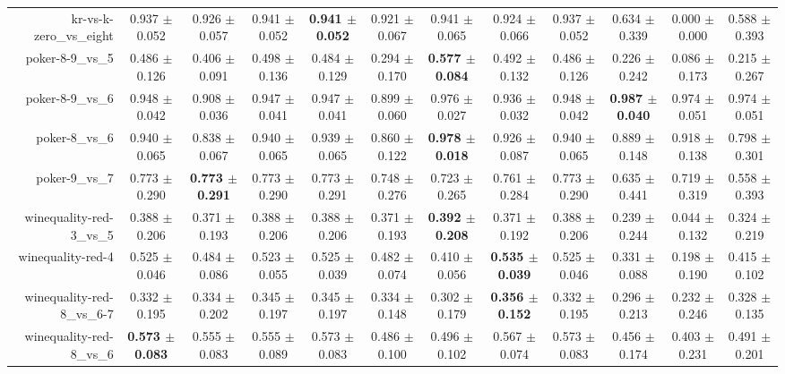 \begin{table}[!ht]
{\begin{tabular}{r c c c c c c c c c c c}
kr-vs-k-zero\_vs\_eight & 0.937 $\pm$ 0.052 & 0.926 $\pm$ 0.057 & 0.941 $\pm$ 0.052 & \textbf{0.941 $\pm$ 0.052} & 0.921 $\pm$ 0.067 & 0.941 $\pm$ 0.065 & 0.924 $\pm$ 0.066 & 0.937 $\pm$ 0.052 & 0.634 $\pm$ 0.339 & 0.000 $\pm$ 0.000 & 0.588 $\pm$ 0.393 \\
poker-8-9\_vs\_5 & 0.486 $\pm$ 0.126 & 0.406 $\pm$ 0.091 & 0.498 $\pm$ 0.136 & 0.484 $\pm$ 0.129 & 0.294 $\pm$ 0.170 & \textbf{0.577 $\pm$ 0.084} & 0.492 $\pm$ 0.132 & 0.486 $\pm$ 0.126 & 0.226 $\pm$ 0.242 & 0.086 $\pm$ 0.173 & 0.215 $\pm$ 0.267 \\
poker-8-9\_vs\_6 & 0.948 $\pm$ 0.042 & 0.908 $\pm$ 0.036 & 0.947 $\pm$ 0.041 & 0.947 $\pm$ 0.041 & 0.899 $\pm$ 0.060 & 0.976 $\pm$ 0.027 & 0.936 $\pm$ 0.032 & 0.948 $\pm$ 0.042 & \textbf{0.987 $\pm$ 0.040} & 0.974 $\pm$ 0.051 & 0.974 $\pm$ 0.051 \\
poker-8\_vs\_6 & 0.940 $\pm$ 0.065 & 0.838 $\pm$ 0.067 & 0.940 $\pm$ 0.065 & 0.939 $\pm$ 0.065 & 0.860 $\pm$ 0.122 & \textbf{0.978 $\pm$ 0.018} & 0.926 $\pm$ 0.087 & 0.940 $\pm$ 0.065 & 0.889 $\pm$ 0.148 & 0.918 $\pm$ 0.138 & 0.798 $\pm$ 0.301 \\
poker-9\_vs\_7 & 0.773 $\pm$ 0.290 & \textbf{0.773 $\pm$ 0.291} & 0.773 $\pm$ 0.290 & 0.773 $\pm$ 0.291 & 0.748 $\pm$ 0.276 & 0.723 $\pm$ 0.265 & 0.761 $\pm$ 0.284 & 0.773 $\pm$ 0.290 & 0.635 $\pm$ 0.441 & 0.719 $\pm$ 0.319 & 0.558 $\pm$ 0.393 \\
winequality-red-3\_vs\_5 & 0.388 $\pm$ 0.206 & 0.371 $\pm$ 0.193 & 0.388 $\pm$ 0.206 & 0.388 $\pm$ 0.206 & 0.371 $\pm$ 0.193 & \textbf{0.392 $\pm$ 0.208} & 0.371 $\pm$ 0.192 & 0.388 $\pm$ 0.206 & 0.239 $\pm$ 0.244 & 0.044 $\pm$ 0.132 & 0.324 $\pm$ 0.219 \\
winequality-red-4 & 0.525 $\pm$ 0.046 & 0.484 $\pm$ 0.086 & 0.523 $\pm$ 0.055 & 0.525 $\pm$ 0.039 & 0.482 $\pm$ 0.074 & 0.410 $\pm$ 0.056 & \textbf{0.535 $\pm$ 0.039} & 0.525 $\pm$ 0.046 & 0.331 $\pm$ 0.088 & 0.198 $\pm$ 0.190 & 0.415 $\pm$ 0.102 \\
winequality-red-8\_vs\_6-7 & 0.332 $\pm$ 0.195 & 0.334 $\pm$ 0.202 & 0.345 $\pm$ 0.197 & 0.345 $\pm$ 0.197 & 0.334 $\pm$ 0.148 & 0.302 $\pm$ 0.179 & \textbf{0.356 $\pm$ 0.152} & 0.332 $\pm$ 0.195 & 0.296 $\pm$ 0.213 & 0.232 $\pm$ 0.246 & 0.328 $\pm$ 0.135 \\
winequality-red-8\_vs\_6 & \textbf{0.573 $\pm$ 0.083} & 0.555 $\pm$ 0.083 & 0.555 $\pm$ 0.089 & 0.573 $\pm$ 0.083 & 0.486 $\pm$ 0.100 & 0.496 $\pm$ 0.102 & 0.567 $\pm$ 0.074 & 0.573 $\pm$ 0.083 & 0.456 $\pm$ 0.174 & 0.403 $\pm$ 0.231 & 0.491 $\pm$ 0.201 \\

\end{tabular}}
\end{table}

